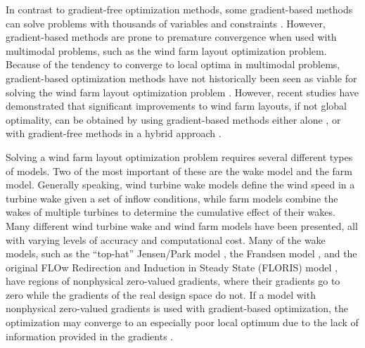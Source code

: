\documentclass[conf]{new-aiaa}
\begin{document}
In contrast to gradient-free optimization methods, some gradient-based methods can solve problems with thousands of variables and constraints \cite{gill2005}. However, gradient-based methods are prone to premature convergence when used with multimodal problems, such as the wind farm layout optimization problem. Because of the tendency to converge to local optima in multimodal problems, gradient-based optimization methods have not historically been seen as viable for solving the wind farm layout optimization problem \cite{acero2014}. However, recent studies have demonstrated that significant improvements to wind farm layouts, if not global optimality, can be obtained by using gradient-based methods either alone \cite{fleming2015, guirguis2016, gebraad2017-max-aep, thomas2017, thomas2018-wec},  or with gradient-free methods in a hybrid approach \cite{rethore2014}. 

Solving a wind farm layout optimization problem requires several different types of models. Two of the most important of these are the wake model and the farm model. Generally speaking, wind turbine wake models define the wind speed in a turbine wake given a set of inflow conditions, while farm models combine the wakes of multiple turbines to determine the cumulative effect of their wakes. Many different wind turbine wake and wind farm models have been presented, all with varying levels of accuracy and computational cost. Many of the wake models, such as the ``top-hat'' Jensen/Park model \cite{jensen1983}, the Frandsen model \cite{frandsen2006}, and the original FLOw Redirection and Induction in Steady State (FLORIS) model \cite{gebraad2014}, have regions of nonphysical zero-valued gradients, where their gradients go to zero while the gradients of the real design space do not. If a model with nonphysical zero-valued gradients is used with gradient-based optimization, the optimization may converge to an especially poor local optimum due to the lack of information provided in the gradients \cite{thomas2017}.
\end{document}
